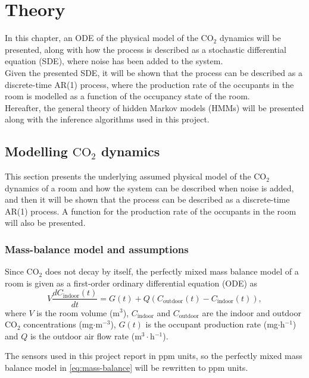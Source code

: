 \chapter{Theory}

In this chapter, an ODE of the physical model of the $\text{CO}_2$ dynamics will be presented, along with
how the process is described as a stochastic differential equation (SDE), where noise has been added to the system. \\
Given the presented SDE, it will be shown that the process can be described as
a discrete-time AR(1) process, where the production rate of the occupants in the room is modelled as a function of the occupancy state of the room. \\
Hereafter, the general theory of hidden Markov models (HMMs) will be presented along
with the inference algorithms used in this project.


\section{Modelling \texorpdfstring{$\text{CO}_2$}{CO2} dynamics}
This section presents the underlying assumed physical model of the $\text{CO}_2$ dynamics of a room and
how the system can be described when noise is added, and then it will be shown that the process can be described as a discrete-time AR(1) process. 
A function for the production rate of the occupants in the room will also be presented.

\subsection{Mass-balance model and assumptions}
Since $\text{CO}_2$ does not decay by itself,
the perfectly mixed mass balance model of a room \parencite{batterman2017, wang1999}
is given as a first-order ordinary differential equation (ODE) as
\begin{equation}
    V \frac{d C_{\text{indoor}}(t)}{dt} = G(t) + Q \left( C_{\text{outdoor}}(t) - C_{\text{indoor}}(t) \right),
    \label{eq:mass-balance}
\end{equation}
where $V$ is the room volume (m$^3$), $C_{\text{indoor}}$ and $C_{\text{outdoor}}$ are the
indoor and outdoor $\text{CO}_2$ concentrations (mg$\cdot$m$^{-3}$), $G(t)$ is the occupant
production rate (mg$\cdot$h$^{-1}$) and $Q$ is the outdoor air flow rate (m$^3\cdot$h$^{-1}$).
\bigskip

The sensors used in this project report in ppm units, so the perfectly mixed mass balance model in \cref{eq:mass-balance} will be rewritten
to ppm units. 


